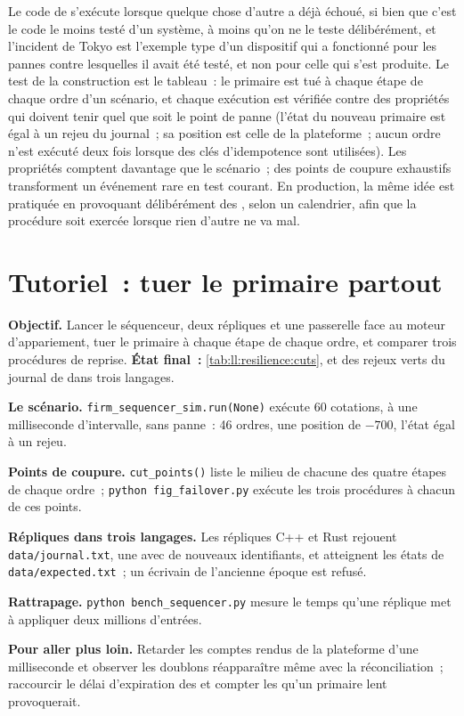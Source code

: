 Le code de  s'exécute lorsque quelque chose d'autre a déjà échoué, si bien que c'est le code le moins testé d'un système, à moins qu'on ne le teste
délibérément, et l'incident de Tokyo est l'exemple type d'un dispositif qui a fonctionné pour les pannes contre lesquelles il avait été testé, et non
pour celle qui s'est produite. Le test de la construction est le tableau~: le primaire est tué à chaque étape de chaque ordre d'un scénario,
et chaque exécution est vérifiée contre des propriétés qui doivent tenir quel que soit le point de panne (l'état du nouveau primaire est égal à un rejeu
du journal~; sa position est celle de la plateforme~; aucun ordre n'est exécuté deux fois lorsque des clés d'idempotence sont utilisées). Les propriétés
comptent davantage que le scénario~; des points de coupure exhaustifs transforment un événement rare en test courant. En production, la même idée est
pratiquée en provoquant délibérément des , selon un calendrier, afin que la procédure soit exercée lorsque rien d'autre ne va mal.

\section{Tutoriel~: tuer le primaire partout}\label{tut:ll:resilience:tut}

\begin{tutorial}
\textbf{Objectif.} Lancer le séquenceur, deux répliques et une passerelle face au moteur d'appariement, tuer le primaire à chaque étape
de chaque ordre, et comparer trois procédures de reprise. \textbf{État final~:} \cref{tab:ll:resilience:cuts}, et des rejeux verts du
journal de  dans trois langages.
\begin{tutsteps}
\item \textbf{Le scénario.} \texttt{firm\_sequencer\_sim.run(None)} exécute 60 cotations, à une milliseconde d'intervalle, sans panne~: 46
ordres, une position de $-700$, l'état égal à un rejeu.
\item \textbf{Points de coupure.} \texttt{cut\_points()} liste le milieu de chacune des quatre étapes de chaque ordre~;
\texttt{python fig\_failover.py} exécute les trois procédures à chacun de ces points.
\item \textbf{Répliques dans trois langages.} Les répliques C++ et Rust rejouent \texttt{data/journal.txt}, une  avec de nouveaux
identifiants, et atteignent les états de \texttt{data/expected.txt}~; un écrivain de l'ancienne époque est refusé.
\item \textbf{Rattrapage.} \texttt{python bench\_sequencer.py} mesure le temps qu'une réplique met à appliquer deux millions d'entrées.
\end{tutsteps}
\textbf{Pour aller plus loin.} Retarder les comptes rendus de la plateforme d'une milliseconde et observer les doublons réapparaître même avec la réconciliation~;
raccourcir le délai d'expiration des  et compter les  qu'un primaire lent provoquerait.
\end{tutorial}

